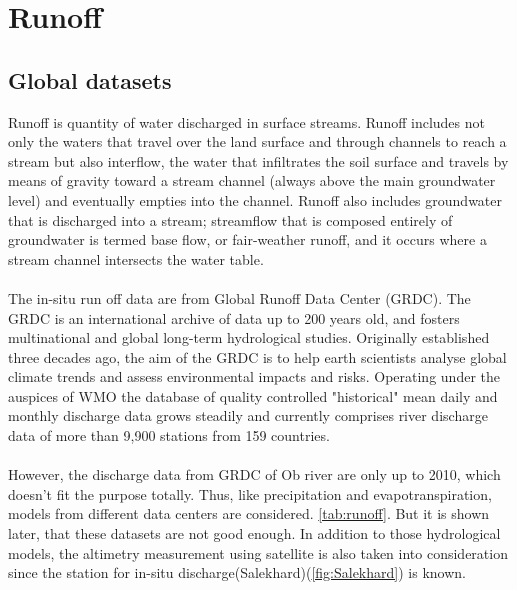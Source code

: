 \section{Runoff}\label{sec:runoff}
\subsection{Global datasets}
Runoff is quantity of water discharged in surface streams. Runoff includes not only the waters that travel over the land surface and through channels to reach a stream but also interflow, the water that infiltrates the soil surface and travels by means of gravity toward a stream channel (always above the main groundwater level) and eventually empties into the channel. Runoff also includes groundwater that is discharged into a stream; streamflow that is composed entirely of groundwater is termed base flow, or fair-weather runoff, and it occurs where a stream channel intersects the water table.\\\\
The in-situ run off data are from Global Runoff Data Center (GRDC). The GRDC is an international archive of data up to 200 years old, and fosters multinational and global long-term hydrological studies. Originally established three decades ago, the aim of the GRDC is to help earth scientists analyse global climate trends and assess environmental impacts and risks. Operating under the auspices of WMO the database of quality controlled "historical" mean daily and monthly discharge data grows steadily and currently comprises river discharge data of more than 9,900 stations from 159 countries.\\\\
However, the discharge data from GRDC of Ob river are only up to 2010, which doesn't fit the purpose totally. Thus, like precipitation and evapotranspiration, models from different data centers are considered. \autoref{tab:runoff}. But it is shown later, that these datasets are not good enough. In addition to those hydrological models, the altimetry measurement using satellite is also taken into consideration since the station for in-situ discharge(Salekhard)(\autoref{fig:Salekhard}) is known. 
